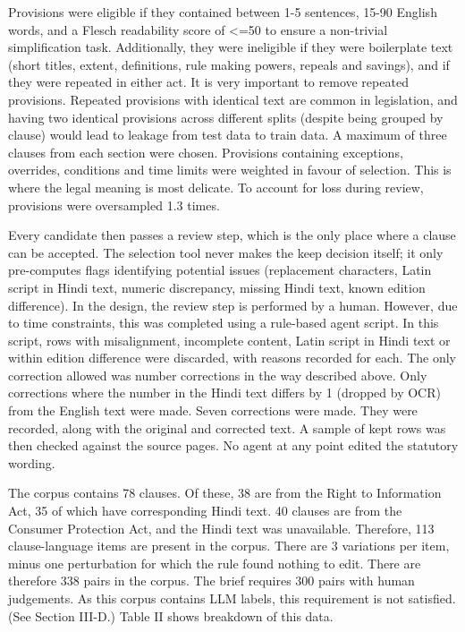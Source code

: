 \documentclass[conference]{IEEEtran}
\begin{document}
Provisions were eligible if they contained between 1-5 sentences, 15-90 English words, and a Flesch readability score of <=50 to ensure a non-trivial simplification task. Additionally, they were ineligible if they were boilerplate text (short titles, extent, definitions, rule making powers, repeals and savings), and if they were repeated in either act. It is very important to remove repeated provisions. Repeated provisions with identical text are common in legislation, and having two identical provisions across different splits (despite being grouped by clause) would lead to leakage from test data to train data. A maximum of three clauses from each section were chosen. Provisions containing exceptions, overrides, conditions and time limits were weighted in favour of selection. This is where the legal meaning is most delicate. To account for loss during review, provisions were oversampled 1.3 times.

Every candidate then passes a review step, which is the only place where a clause can be accepted. The selection tool never makes the keep decision itself; it only pre-computes flags identifying potential issues (replacement characters, Latin script in Hindi text, numeric discrepancy, missing Hindi text, known edition difference). In the design, the review step is performed by a human. However, due to time constraints, this was completed using a rule-based agent script. In this script, rows with misalignment, incomplete content, Latin script in Hindi text or within edition difference were discarded, with reasons recorded for each. The only correction allowed was number corrections in the way described above. Only corrections where the number in the Hindi text differs by 1 (dropped by OCR) from the English text were made. Seven corrections were made. They were recorded, along with the original and corrected text. A sample of kept rows was then checked against the source pages. No agent at any point edited the statutory wording.

The corpus contains 78 clauses. Of these, 38 are from the Right to Information Act, 35 of which have corresponding Hindi text. 40 clauses are from the Consumer Protection Act, and the Hindi text was unavailable. Therefore, 113 clause-language items are present in the corpus. There are 3 variations per item, minus one perturbation for which the rule found nothing to edit. There are therefore 338 pairs in the corpus. The brief requires 300 pairs with human judgements. As this corpus contains LLM labels, this requirement is not satisfied. (See Section III-D.) Table II shows breakdown of this data.
\end{document}
